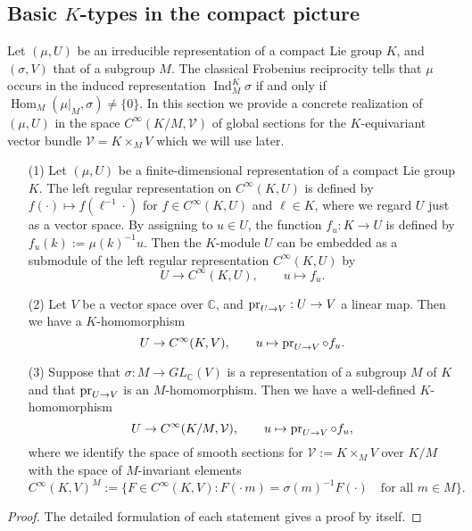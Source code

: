 \subsection{Basic $K$-types in the compact picture}
\label{subsec:minKK}
Let $(\mu,U)$ be an irreducible representation
 of a compact Lie group $K$, 
 and $(\sigma,V)$ that of a subgroup $M$.  
The classical Frobenius reciprocity tells
 that $\mu$ occurs in the induced representation 
 ${\operatorname{Ind}}_M^K \sigma$
 if and only if ${\operatorname{Hom}}_M(\mu|_M, \sigma) \ne \{0\}$.  
In this section we provide a concrete realization
 of $(\mu,U)$
 in the space $C^{\infty}(K/M, {\mathcal{V}})$
 of global sections 
 for the $K$-equivariant vector bundle 
 ${\mathcal{V}}=K \times_M V$
 which we will use later.  
\begin{lemma}
\label{lem:KM}
\begin{enumerate}
\item[{\rm{(1)}}]
Let $(\mu,U)$ be a finite-dimensional representation
 of a compact Lie group $K$.  
The left regular representation
 on $C^{\infty}(K,U)$ is defined by $f(\cdot) \mapsto f({\ell}^{-1} \cdot)$
 for $f \in C^{\infty}(K,U)$ and ${\ell} \in K$, 
 where we regard $U$ just as a vector space.  
By assigning to $u \in U$, 
 the function $f_u \colon K \to U$ is defined by 
 $f_u(k):=\mu(k)^{-1}u$.  
Then the $K$-module $U$ can be embedded 
 as a submodule of the left regular representation $C^{\infty}(K,U)$
 by
\[
  U \to C^{\infty}(K,U),
  \qquad
  u \mapsto f_u.  
\]
\item[{\rm{(2)}}]
Let $V$ be a vector space over ${\mathbb{C}}$, 
 and $\operatorname{pr}_{{U}\to{V}} :U \to V$ a linear map.  
Then we have a $K$-homomorphism
\[
  U \to C^{\infty}(K,V),
  \qquad
  u \mapsto \operatorname{pr}_{{U}\to{V}} \circ f_u.  
\]
\item[{\rm{(3)}}]
Suppose that $\sigma:M \to GL_{\mathbb{C}}(V)$ is
 a representation of a subgroup $M$ of $K$ 
 and that $\operatorname{pr}_{{U}\to{V}}$ is an $M$-homomorphism.  
Then we have a well-defined $K$-homomorphism
\[
  U \to C^{\infty}(K/M,{\mathcal{V}}),
  \qquad
  u \mapsto \operatorname{pr}_{{U}\to{V}} \circ f_u,  
\]
where we identify the space
 of smooth sections
 for ${\mathcal{V}}:=K \times_M V$
 over $K/M$ 
with the space of $M$-invariant elements
\[
  C^{\infty}(K,V)^M
  :=
  \{F \in C^{\infty}(K,V)
    :
    F(\cdot\, m)=\sigma(m)^{-1}F(\cdot)
   \quad
   \text{for all }
   m \in M\}.  
\]
\end{enumerate}
\end{lemma}
\begin{proof}
The detailed formulation of each statement gives a proof by itself.  
\end{proof}

